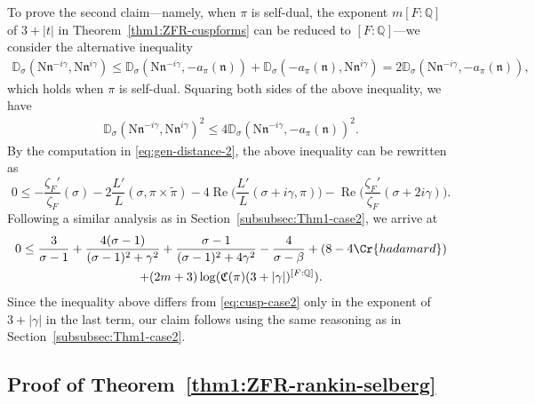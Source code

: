 \documentclass[12pt,reqno]{amsart}
\renewcommand{\tilde}{\widetilde}
\theoremstyle{remark}
\renewcommand{\tilde}{\widetilde}
\DeclareMathOperator{\Real}{Re}
\renewcommand{\tilde}{\widetilde}
\newcommand{\N}{\mathrm{N}}
\newcommand{\Q}{\mathbb{Q}}
\newcommand{\kn}{\mathfrak{n}}
\numberwithin{equation}{section}
\begin{document}
    To prove the second claim---namely, when $\pi$ is self-dual, the exponent $m[F:\Q]$ of $3+|t|$ in Theorem~\ref{thm1:ZFR-cuspforms} can be reduced to $[F:\Q]$---we consider the alternative inequality
	\begin{equation*}
		\begin{aligned}
			\mathbb{D}_{\sigma}(\N\kn^{-i\gamma}, \N\kn^{i\gamma}) \le 
			\mathbb{D}_{\sigma}( \N\kn^{-i\gamma}, -a_{\pi}(\kn)) + \mathbb{D}_{\sigma}(-a_{\pi}(\kn), \N\kn^{i\gamma})
			= 2\mathbb{D}_{\sigma}( \N\kn^{-i\gamma},-a_{\pi}(\kn)), 
		\end{aligned}
	\end{equation*}
    which holds when $\pi$ is self-dual. 
    Squaring both sides of the above inequality, we have
	\begin{equation*}
		\begin{aligned}
			\mathbb{D}_{\sigma}(\N\kn^{-i\gamma}, \N\kn^{i\gamma})^2 \le 
			4\mathbb{D}_{\sigma}( \N\kn^{-i\gamma},-a_{\pi}(\kn))^2.
		\end{aligned}
	\end{equation*}   
   By the computation in \eqref{eq:gen-distance-2}, the above inequality can be rewritten as
    \begin{equation*}
		0 \le -\frac{\zeta_F'}{\zeta_F}(\sigma) -2\frac{L'}{L}(\sigma, \pi\times \tilde{\pi}) -4\Real\Big(\frac{L'}{L}(\sigma+i\gamma, \pi )\Big)-\Real\Big(\frac{\zeta_F'}{\zeta_F}(\sigma+2i\gamma)\Big). 
    \end{equation*}
     Following a similar analysis as in Section~\ref{subsubsec:Thm1-case2}, we arrive at
	\begin{multline*}
			0 
			\le \frac{3}{\sigma-1}+ \frac{4(\sigma-1)}{(\sigma-1)^2 +\gamma^2}+ \frac{\sigma-1}{(\sigma-1)^2 +4\gamma^2} - \frac{4}{\sigma-\beta}+(8-4\Cr{hadamard})\\
            + (2m+3)\log(\mathfrak{C}(\pi) (3+|\gamma|)^{[F:\Q]}).
		\end{multline*}  
        Since the inequality above differs from \eqref{eq:cusp-case2} only in the exponent of  $3+|\gamma|$ in the last term, our claim follows using the same reasoning as in Section~\ref{subsubsec:Thm1-case2}.

    
    \subsection{Proof of Theorem~\ref{thm1:ZFR-rankin-selberg}}\label{subsec:thm2}
	
\end{document}
